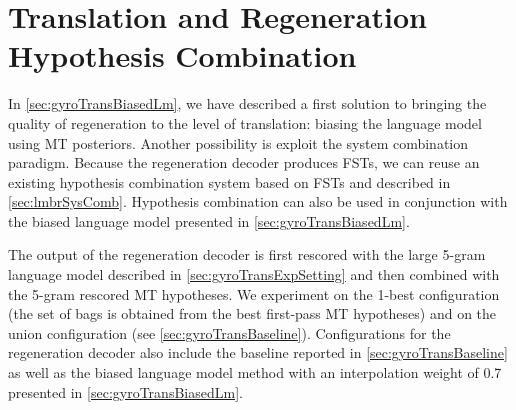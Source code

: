 
\section[Translation and Regeneration Hypothesis Combination]{Translation and Regeneration \\ Hypothesis Combination}
\label{sec:gyroTransSysComb}


In \autoref{sec:gyroTransBiasedLm}, we have described
a first solution to bringing the quality of regeneration
to the level of translation: biasing the language model using
MT posteriors.
Another possibility is exploit
the system combination paradigm.
Because the regeneration decoder produces FSTs, we can
reuse an existing hypothesis combination system based on FSTs and
described in \autoref{sec:lmbrSysComb}.
Hypothesis combination can also be used in conjunction
with the biased language model presented in \autoref{sec:gyroTransBiasedLm}.

The output of the regeneration decoder is first rescored with
the large 5-gram language model described
in \autoref{sec:gyroTransExpSetting} and then combined with the
5-gram rescored MT hypotheses.
We experiment on the
1-best configuration (the set of bags is obtained
from the best first-pass MT hypotheses) and on the union
configuration (see \autoref{sec:gyroTransBaseline}).
Configurations for the regeneration decoder also
include the baseline reported in \autoref{sec:gyroTransBaseline}
as well as the biased language model method with an interpolation
weight of 0.7 presented in \autoref{sec:gyroTransBiasedLm}.


